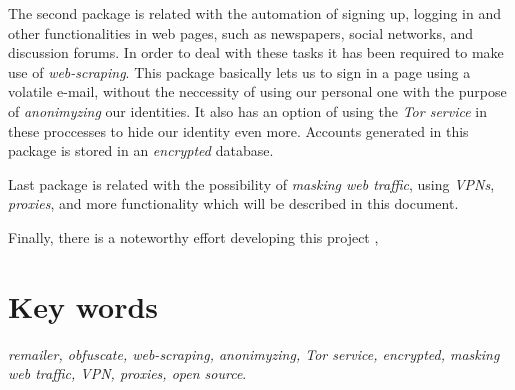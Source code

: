The second package is related with the automation of signing up,
logging in and other functionalities in web pages, such as newspapers,
social networks, and discussion forums. In order to deal with these
tasks it has been required to make use of \textit{web-scraping}. This
package basically lets us to sign in a page using a volatile e-mail,
without the neccessity of using our personal one with the purpose of
\textit{anonimyzing} our identities. It also has an option of using
the \textit{Tor service} in these proccesses to hide our identity even
more. Accounts generated in this package is stored in an
\textit{encrypted} database.

Last package is related with the possibility of \textit{masking web
  traffic}, using \textit{VPNs}, \textit{proxies}, and more
functionality which will be described in this document.

Finally, there is a noteworthy effort  developing this
project ,


\section*{Key words}
\textit{remailer, obfuscate, web-scraping, anonimyzing, Tor service, encrypted, masking web traffic, VPN, proxies, open source}.

